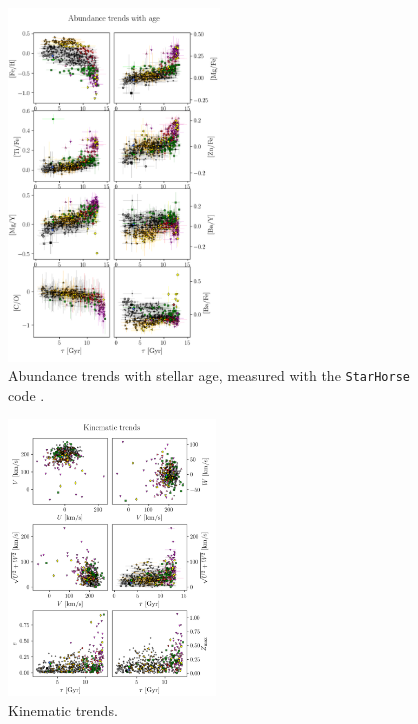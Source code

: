 \documentclass{aa}  %
\begin{document}
\begin{figure}\centering
 \includegraphics[width=0.5\textwidth]{im/harps_tsne-age-abundsplot_teffcut.png}
\caption{Abundance trends with stellar age, measured with the \texttt{StarHorse} code \citep{Queiroz2018}.}
\label{age}
\end{figure}

\begin{figure}\centering
 \includegraphics[width=0.49\textwidth]{im/harps_tsne-kin-abundsplot_teffcut.png}
\caption{Kinematic trends.}
\label{kin}
\end{figure}
\end{document}
